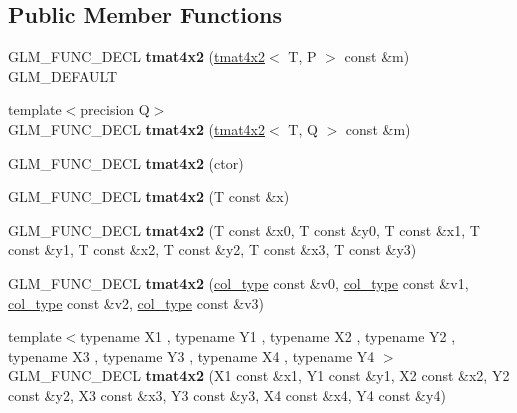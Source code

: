 \subsection*{Public Member Functions}
\begin{DoxyCompactItemize}
\item 
\hypertarget{structglm_1_1tmat4x2_a1ec4ffe08fa426bf1639d87f08ce0163}{G\-L\-M\-\_\-\-F\-U\-N\-C\-\_\-\-D\-E\-C\-L {\bfseries tmat4x2} (\hyperlink{structglm_1_1tmat4x2}{tmat4x2}$<$ T, P $>$ const \&m) G\-L\-M\-\_\-\-D\-E\-F\-A\-U\-L\-T}\label{structglm_1_1tmat4x2_a1ec4ffe08fa426bf1639d87f08ce0163}

\item 
\hypertarget{structglm_1_1tmat4x2_a9f5f9c3246c12a56efb4a81ccb83b844}{{\footnotesize template$<$precision Q$>$ }\\G\-L\-M\-\_\-\-F\-U\-N\-C\-\_\-\-D\-E\-C\-L {\bfseries tmat4x2} (\hyperlink{structglm_1_1tmat4x2}{tmat4x2}$<$ T, Q $>$ const \&m)}\label{structglm_1_1tmat4x2_a9f5f9c3246c12a56efb4a81ccb83b844}

\item 
\hypertarget{structglm_1_1tmat4x2_a7144abc623729473eb6caceaf59a378e}{G\-L\-M\-\_\-\-F\-U\-N\-C\-\_\-\-D\-E\-C\-L {\bfseries tmat4x2} (ctor)}\label{structglm_1_1tmat4x2_a7144abc623729473eb6caceaf59a378e}

\item 
\hypertarget{structglm_1_1tmat4x2_abe30c7b751f69d539a7853a0258a57f8}{G\-L\-M\-\_\-\-F\-U\-N\-C\-\_\-\-D\-E\-C\-L {\bfseries tmat4x2} (T const \&x)}\label{structglm_1_1tmat4x2_abe30c7b751f69d539a7853a0258a57f8}

\item 
\hypertarget{structglm_1_1tmat4x2_a3ab85db1ba578570171cc1d2e43dbbc3}{G\-L\-M\-\_\-\-F\-U\-N\-C\-\_\-\-D\-E\-C\-L {\bfseries tmat4x2} (T const \&x0, T const \&y0, T const \&x1, T const \&y1, T const \&x2, T const \&y2, T const \&x3, T const \&y3)}\label{structglm_1_1tmat4x2_a3ab85db1ba578570171cc1d2e43dbbc3}

\item 
\hypertarget{structglm_1_1tmat4x2_a8933e0720a7af449987c8604fc2f1d92}{G\-L\-M\-\_\-\-F\-U\-N\-C\-\_\-\-D\-E\-C\-L {\bfseries tmat4x2} (\hyperlink{structglm_1_1tvec2}{col\-\_\-type} const \&v0, \hyperlink{structglm_1_1tvec2}{col\-\_\-type} const \&v1, \hyperlink{structglm_1_1tvec2}{col\-\_\-type} const \&v2, \hyperlink{structglm_1_1tvec2}{col\-\_\-type} const \&v3)}\label{structglm_1_1tmat4x2_a8933e0720a7af449987c8604fc2f1d92}

\item 
\hypertarget{structglm_1_1tmat4x2_affe5fab2286a957920117dc8f8893a34}{{\footnotesize template$<$typename X1 , typename Y1 , typename X2 , typename Y2 , typename X3 , typename Y3 , typename X4 , typename Y4 $>$ }\\G\-L\-M\-\_\-\-F\-U\-N\-C\-\_\-\-D\-E\-C\-L {\bfseries tmat4x2} (X1 const \&x1, Y1 const \&y1, X2 const \&x2, Y2 const \&y2, X3 const \&x3, Y3 const \&y3, X4 const \&x4, Y4 const \&y4)}\label{structglm_1_1tmat4x2_affe5fab2286a957920117dc8f8893a34}


\end{DoxyCompactItemize}
